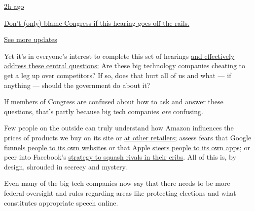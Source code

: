 \href{https://www.nytimes3xbfgragh.onion/live/2020/07/29/technology/tech-ceos-hearing-testimony?action=click\&pgtype=Article\&state=default\&region=MAIN_CONTENT_1\&context=storylines_live_updates\#dont-only-blame-congress-if-this-hearing-goes-off-the-rails}{2h
ago}

\href{https://www.nytimes3xbfgragh.onion/live/2020/07/29/technology/tech-ceos-hearing-testimony?action=click\&pgtype=Article\&state=default\&region=MAIN_CONTENT_1\&context=storylines_live_updates\#dont-only-blame-congress-if-this-hearing-goes-off-the-rails}{Don't
(only) blame Congress if this hearing goes off the rails.}

\href{https://www.nytimes3xbfgragh.onion/live/2020/07/29/technology/tech-ceos-hearing-testimony?action=click\&pgtype=Article\&state=default\&region=MAIN_CONTENT_1\&context=storylines_live_updates}{See
more updates}

Yet it's in everyone's interest to complete this set of hearings
\href{https://www.nytimes3xbfgragh.onion/2020/05/22/technology/google-antitrust.html}{and
effectively address these central questions:} Are these big technology
companies cheating to get a leg up over competitors? If so, does that
hurt all of us and what --- if anything --- should the government do
about it?

If members of Congress are confused about how to ask and answer these
questions, that's partly because big tech companies \emph{are}
confusing.

Few people on the outside can truly understand how Amazon influences the
prices of products we buy on its site or
\href{https://www.bloomberg.com/news/articles/2019-08-05/amazon-is-squeezing-sellers-that-offer-better-prices-on-walmart}{at
other retailers}; assess fears that Google
\href{https://themarkup.org/google-the-giant/2020/07/28/google-search-results-prioritize-google-products-over-competitors}{funnels
people to its own websites} or that Apple
\href{https://www.nytimes3xbfgragh.onion/interactive/2019/09/09/technology/apple-app-store-competition.html}{steers
people to its own apps}; or peer into Facebook's
\href{https://www.nytimes3xbfgragh.onion/2018/12/05/technology/facebook-emails-privacy-data.html}{strategy
to squash rivals in their cribs}. All of this is, by design, shrouded in
secrecy and mystery.

Even many of the big tech companies now say that there needs to be more
federal oversight and rules regarding areas like protecting elections
and what constitutes appropriate speech online.

